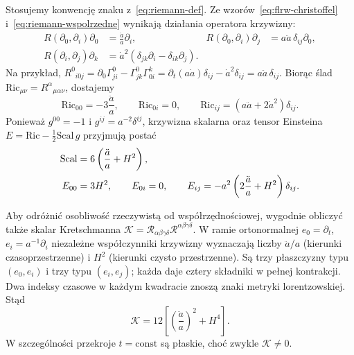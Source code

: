 \begin{przyklad}
\label{prz:flrw-krzywizna}
Stosujemy konwencję znaku z~\eqref{eq:riemann-def}.
Ze wzorów~\eqref{eq:flrw-christoffel}
i~\eqref{eq:riemann-wspolrzedne} wynikają działania
operatora krzywizny:
\begin{align*}
 R(\partial_0,\partial_i)\partial_0
   &=\frac{\ddot a}{a}\partial_i, &
 R(\partial_0,\partial_i)\partial_j
   &=a\ddot a\,\delta_{ij}\partial_0,\\
 R(\partial_i,\partial_j)\partial_k
   &=\dot a^2(\delta_{jk}\partial_i-\delta_{ik}\partial_j).
\end{align*}
Na przykład,
$R^0{}_{i0j}=\partial_0\Gamma^0_{ji}
-\Gamma^0_{jk}\Gamma^k_{0i}
=\partial_t(a\dot a)\delta_{ij}-\dot a^2\delta_{ij}
=a\ddot a\,\delta_{ij}$.
Biorąc ślad $\mathrm{Ric}_{\mu\nu}=R^\alpha{}_{\mu\alpha\nu}$,
dostajemy
\begin{equation}\label{eq:flrw-ricci}
 \mathrm{Ric}_{00}=-3\frac{\ddot a}{a},\qquad
 \mathrm{Ric}_{0i}=0,\qquad
 \mathrm{Ric}_{ij}=(a\ddot a+2\dot a^2)\delta_{ij}.
\end{equation}
Ponieważ $g^{00}=-1$ i $g^{ij}=a^{-2}\delta^{ij}$,
krzywizna skalarna oraz tensor Einsteina
$E=\mathrm{Ric}-\tfrac12\mathrm{Scal}\,g$ przyjmują postać
\begin{align}\label{eq:flrw-scalar-einstein}
 \mathrm{Scal}
  &=6\left(\frac{\ddot a}{a}+H^2\right),\notag\\
 E_{00}&=3H^2,\qquad E_{0i}=0,\qquad
 E_{ij}=-a^2\left(2\frac{\ddot a}{a}+H^2\right)\delta_{ij}.
\end{align}

Aby odróżnić osobliwość rzeczywistą od współrzędnościowej,
wygodnie obliczyć także skalar Kretschmanna
$\mathcal K=\mathcal R_{\alpha\beta\gamma\delta}
\mathcal R^{\alpha\beta\gamma\delta}$.
W ramie ortonormalnej $e_0=\partial_t$, $e_i=a^{-1}\partial_i$
niezależne współczynniki krzywizny wyznaczają liczby
$\ddot a/a$ (kierunki czasoprzestrzenne) i $H^2$
(kierunki czysto przestrzenne).
Są trzy płaszczyzny typu $(e_0,e_i)$
i trzy typu $(e_i,e_j)$; każda daje cztery
składniki w pełnej kontrakcji. Dwa indeksy
czasowe w każdym kwadracie znoszą znaki
metryki lorentzowskiej. Stąd
\begin{equation}\label{eq:flrw-kretschmann}
 \mathcal K=12\left[\left(\frac{\ddot a}{a}\right)^2+H^4\right].
\end{equation}
W szczególności przekroje $t=\mathrm{const}$ są płaskie,
choć zwykle $\mathcal K\ne0$.
\end{przyklad}


